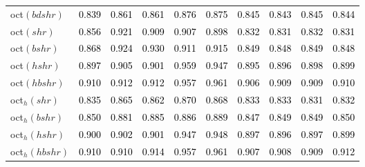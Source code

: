 \begin{tabular}[t]{>{\centering\arraybackslash}m{2.5cm}ccccccccc}
oct$(bdshr)$ & \textcolor{black}{0.839} & \textcolor{black}{0.861} & \textcolor{black}{0.861} & \textcolor{black}{0.876} & \textcolor{black}{0.875} & \textcolor{black}{0.845} & \textcolor{black}{0.843} & \textcolor{black}{0.845} & \textcolor{black}{0.844}\\
oct$(shr)$ & \textcolor{black}{0.856} & \textcolor{black}{0.921} & \textcolor{black}{0.909} & \textcolor{black}{0.907} & \textcolor{black}{0.898} & \textcolor{black}{0.832} & \textcolor{black}{0.831} & \textcolor{black}{0.832} & \textcolor{black}{0.831}\\
oct$(bshr)$ & \textcolor{black}{0.868} & \textcolor{black}{0.924} & \textcolor{black}{0.930} & \textcolor{black}{0.911} & \textcolor{black}{0.915} & \textcolor{black}{0.849} & \textcolor{black}{0.848} & \textcolor{black}{0.849} & \textcolor{black}{0.848}\\
oct$(hshr)$ & \textcolor{black}{0.897} & \textcolor{black}{0.905} & \textcolor{black}{0.901} & \textcolor{black}{0.959} & \textcolor{black}{0.947} & \textcolor{black}{0.895} & \textcolor{black}{0.896} & \textcolor{black}{0.898} & \textcolor{black}{0.899}\\
oct$(hbshr)$ & \textcolor{black}{0.910} & \textcolor{black}{0.912} & \textcolor{black}{0.912} & \textcolor{black}{0.957} & \textcolor{black}{0.961} & \textcolor{black}{0.906} & \textcolor{black}{0.909} & \textcolor{black}{0.909} & \textcolor{black}{0.910}\\
oct$_h(shr)$ & \textcolor{black}{0.835} & \textcolor{black}{0.865} & \textcolor{black}{0.862} & \textcolor{black}{0.870} & \textcolor{black}{0.868} & \textcolor{black}{0.833} & \textcolor{black}{0.833} & \textcolor{black}{0.831} & \textcolor{black}{0.832}\\
oct$_h(bshr)$ & \textcolor{black}{0.850} & \textcolor{black}{0.881} & \textcolor{black}{0.885} & \textcolor{black}{0.886} & \textcolor{black}{0.889} & \textcolor{black}{0.847} & \textcolor{black}{0.849} & \textcolor{black}{0.849} & \textcolor{black}{0.850}\\
oct$_h(hshr)$ & \textcolor{black}{0.900} & \textcolor{black}{0.902} & \textcolor{black}{0.901} & \textcolor{black}{0.947} & \textcolor{black}{0.948} & \textcolor{black}{0.897} & \textcolor{black}{0.896} & \textcolor{black}{0.897} & \textcolor{black}{0.899}\\
oct$_h(hbshr)$ & \textcolor{black}{0.910} & \textcolor{black}{0.910} & \textcolor{black}{0.914} & \textcolor{black}{0.957} & \textcolor{black}{0.961} & \textcolor{black}{0.907} & \textcolor{black}{0.908} & \textcolor{black}{0.909} & \textcolor{black}{0.912}\\
\bottomrule
\end{tabular}
